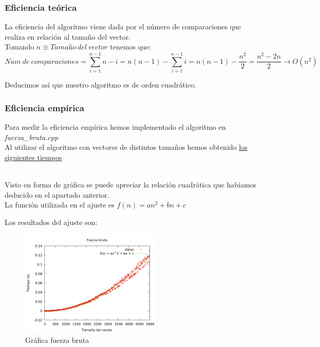 \subsubsection{Eficiencia teórica}
La eficiencia del algoritmo viene dada por el número de comparaciones que realiza en relación al tamaño del vector.\\

Tomando $n \equiv Tamaño\ del\ vector$ tenemos que:\\

$$Num\ de\ comparaciones = \sum_{i=1}^{n-1}n-i = n(n-1) - \sum_{i=1}^{n-1}i = n(n-1) - \frac{n^2}{2} = \frac{n^2 - 2n}{2} \longrightarrow O(n^2)$$

Deducimos así que nuestro algoritmo es de orden cuadrático.\\

\subsubsection{Eficiencia empírica}
Para medir la eficiencia empírica hemos implementado el algoritmo en \textit{fuerza\_bruta.cpp}\\

Al utilizar el algoritmo con vectores de distintos tamaños hemos obtenido \hyperref[tabla_comp]{los siguientes tiempos}\\\

Visto en forma de gráfica se puede apreciar la relación cuadrática que habíamos deducido en el apartado anterior.\\

La función utilizada en el ajuste es $f(n) = an^2 + bn + c$

Los resultados del ajuste son:\\

\begin{center}
\end{center}


\begin{figure}[h]
\centering
	\includegraphics[width=0.6\textwidth]{../Opcional/Graficas/fuerza_bruta_bruno.png}
	\caption{Gráfica fuerza bruta} 
	\label{fig:perros} 
\end{figure}

